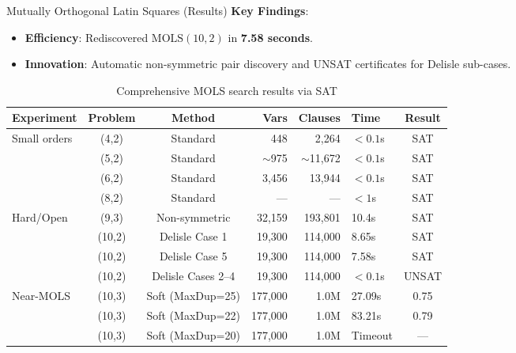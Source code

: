 \documentclass[10pt, aspectratio=169]{beamer}
\begin{document}
\begin{frame}{Mutually Orthogonal Latin Squares (Results)}
    \textbf{Key Findings}:
    \begin{itemize}
        \item \textbf{Efficiency}: Rediscovered $\text{MOLS}(10,2)$ in \textbf{7.58 seconds}.
        \item \textbf{Innovation}: Automatic non-symmetric pair discovery and UNSAT certificates for Delisle sub-cases.
    \end{itemize}

    \begin{table}
    \centering \tiny
    \caption{Comprehensive MOLS search results via SAT}
    \begin{tabular}{lccrrlc}
    \toprule
    \textbf{Experiment} & \textbf{Problem} & \textbf{Method} & \textbf{Vars} & \textbf{Clauses} & \textbf{Time} & \textbf{Result} \\
    \midrule
    Small orders & (4,2) & Standard & 448 & 2,264 & $<0.1$s & SAT \\
    & (5,2) & Standard & $\sim$975 & $\sim$11,672 & $<0.1$s & SAT \\
    & (6,2) & Standard & 3,456 & 13,944 & $<0.1$s & SAT \\
    & (8,2) & Standard & --- & --- & $<1$s & SAT \\
    \midrule
    Hard/Open & (9,3) & Non-symmetric & 32,159 & 193,801 & 10.4s & SAT \\
    & (10,2) & Delisle Case 1 & 19,300 & 114,000 & 8.65s & SAT \\
    & (10,2) & Delisle Case 5 & 19,300 & 114,000 & 7.58s & SAT \\
    & (10,2) & Delisle Cases 2--4 & 19,300 & 114,000 & $<0.1$s & UNSAT \\
    \midrule
    Near-MOLS & (10,3) & Soft (MaxDup=25) & 177,000 & 1.0M & 27.09s & 0.75 \\
    & (10,3) & Soft (MaxDup=22) & 177,000 & 1.0M & 83.21s & 0.79 \\
    & (10,3) & Soft (MaxDup=20) & 177,000 & 1.0M & Timeout & --- \\
    \bottomrule
    \end{tabular}
    \end{table}
\end{frame}
\end{document}

